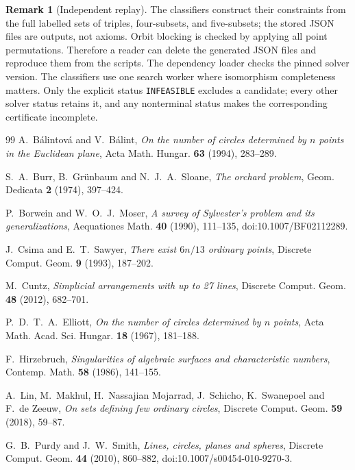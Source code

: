 \documentclass[11pt,a4paper]{article}
\theoremstyle{definition}
\newtheorem{remark}[theorem]{Remark}
\begin{document}
\begin{remark}[Independent replay]
The classifiers construct their constraints from the full labelled sets of
triples, four-subsets, and five-subsets; the stored JSON files are outputs, not
axioms.  Orbit blocking is checked by applying all point permutations.  Therefore a
reader can delete the generated JSON files and reproduce them from the scripts.
The dependency loader checks the pinned solver version.  The classifiers use one
search worker where isomorphism completeness matters.  Only the explicit status
\texttt{INFEASIBLE} excludes a candidate; every other solver status retains it,
and any nonterminal status makes the corresponding certificate incomplete.
\end{remark}

\begin{thebibliography}{99}
\small
{}
A.~B\'alintov\'a and V.~B\'alint,
\emph{On the number of circles determined by $n$ points in the Euclidean plane},
Acta Math. Hungar. \textbf{63} (1994), 283--289.

S.~A.~Burr, B.~Grünbaum and N.~J.~A.~Sloane,
\emph{The orchard problem},
Geom. Dedicata \textbf{2} (1974), 397--424.

P.~Borwein and W.~O.~J.~Moser,
\emph{A survey of Sylvester's problem and its generalizations},
Aequationes Math. \textbf{40} (1990), 111--135,
doi:10.1007/BF02112289.

J.~Csima and E.~T.~Sawyer,
\emph{There exist $6n/13$ ordinary points},
Discrete Comput. Geom. \textbf{9} (1993), 187--202.

M.~Cuntz,
\emph{Simplicial arrangements with up to 27 lines},
Discrete Comput. Geom. \textbf{48} (2012), 682--701.

P.~D.~T.~A.~Elliott,
\emph{On the number of circles determined by $n$ points},
Acta Math. Acad. Sci. Hungar. \textbf{18} (1967), 181--188.

F.~Hirzebruch,
\emph{Singularities of algebraic surfaces and characteristic numbers},
Contemp. Math. \textbf{58} (1986), 141--155.

A.~Lin, M.~Makhul, H.~Nassajian Mojarrad, J.~Schicho,
K.~Swanepoel and F.~de Zeeuw,
\emph{On sets defining few ordinary circles},
Discrete Comput. Geom. \textbf{59} (2018), 59--87.

G.~B.~Purdy and J.~W.~Smith,
\emph{Lines, circles, planes and spheres},
Discrete Comput. Geom. \textbf{44} (2010), 860--882,
doi:10.1007/s00454-010-9270-3.


\end{thebibliography}
\end{document}
